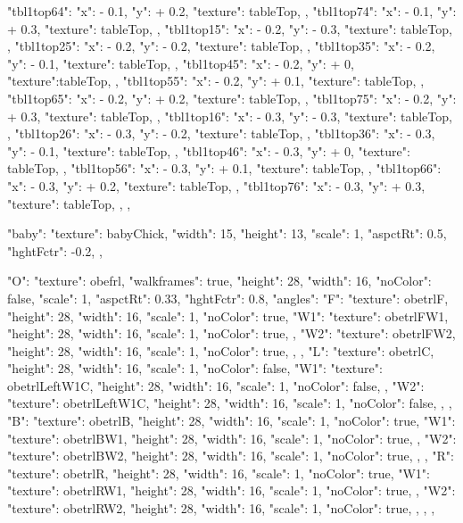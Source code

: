 {{{      "tbl1top64":{ "x": - 0.1, "y": + 0.2, "texture": tableTop, },
      "tbl1top74":{ "x": - 0.1, "y": + 0.3, "texture": tableTop, },
      "tbl1top15":{ "x": - 0.2, "y": - 0.3, "texture": tableTop, },
      "tbl1top25":{ "x": - 0.2, "y": - 0.2, "texture": tableTop, },
      "tbl1top35":{ "x": - 0.2, "y": - 0.1, "texture": tableTop, },
      "tbl1top45":{ "x": - 0.2, "y": + 0, "texture":tableTop, },
      "tbl1top55":{ "x": - 0.2, "y": + 0.1, "texture": tableTop, },
      "tbl1top65":{ "x": - 0.2, "y": + 0.2, "texture": tableTop, },
      "tbl1top75":{ "x": - 0.2, "y": + 0.3, "texture": tableTop, },
      "tbl1top16":{ "x": - 0.3, "y": - 0.3, "texture": tableTop, },
      "tbl1top26":{ "x": - 0.3, "y": - 0.2, "texture": tableTop, },
      "tbl1top36":{ "x": - 0.3, "y": - 0.1, "texture": tableTop, },
      "tbl1top46":{ "x": - 0.3, "y": + 0, "texture": tableTop, },
      "tbl1top56":{ "x": - 0.3, "y": + 0.1, "texture": tableTop, },
      "tbl1top66":{ "x": - 0.3, "y": + 0.2, "texture": tableTop, },
      "tbl1top76":{ "x": - 0.3, "y": + 0.3, "texture": tableTop, },
    }
  },

  "baby": {
    "texture": babyChick,
    "width": 15,
    "height": 13,
    "scale": 1,
    "aspctRt": 0.5,
    "hghtFctr": -0.2,
  },

  "O": {
    "texture": obefrl,
    "walkframes": true,
    "height": 28,
    "width": 16,
    "noColor": false,
    "scale": 1,
    "aspctRt": 0.33,
    "hghtFctr": 0.8,
    "angles":{
      "F": {
        "texture": obetrlF,
        "height": 28,
        "width": 16,
        "scale": 1,
        "noColor": true,
        "W1": {
          "texture": obetrlFW1,
          "height": 28,
          "width": 16,
          "scale": 1,
          "noColor": true,
        },
        "W2": {
          "texture": obetrlFW2,
          "height": 28,
          "width": 16,
          "scale": 1,
          "noColor": true,
        },
      },
      "L": {
        "texture": obetrlC,
        "height": 28,
        "width": 16,
        "scale": 1,
        "noColor": false,
        "W1": {
          "texture": obetrlLeftW1C,
          "height": 28,
          "width": 16,
          "scale": 1,
          "noColor": false,
        },
        "W2": {
          "texture": obetrlLeftW1C,
          "height": 28,
          "width": 16,
          "scale": 1,
          "noColor": false,
        },
      },
      "B": {
        "texture": obetrlB,
        "height": 28,
        "width": 16,
        "scale": 1,
        "noColor": true,
        "W1": {
          "texture": obetrlBW1,
          "height": 28,
          "width": 16,
          "scale": 1,
          "noColor": true,
        },
        "W2": {
          "texture": obetrlBW2,
          "height": 28,
          "width": 16,
          "scale": 1,
          "noColor": true,
        },
      },
      "R": {
        "texture": obetrlR,
        "height": 28,
        "width": 16,
        "scale": 1,
        "noColor": true,
        "W1": {
          "texture": obetrlRW1,
          "height": 28,
          "width": 16,
          "scale": 1,
          "noColor": true,
        },
        "W2": {
          "texture": obetrlRW2,
          "height": 28,
          "width": 16,
          "scale": 1,
          "noColor": true,
        },
      },
    }
  },

}
